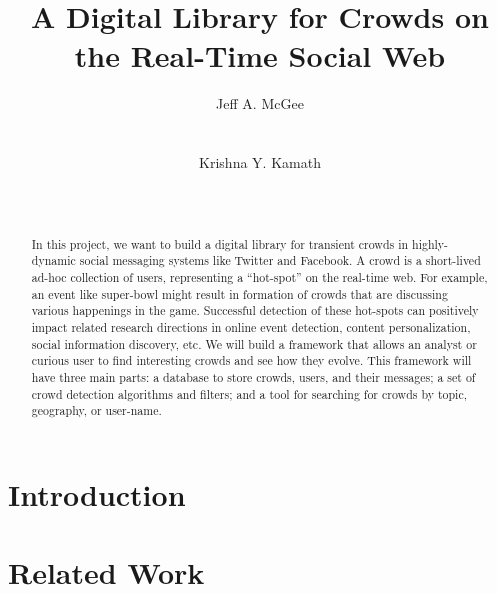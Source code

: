 \documentclass{sig-alternate}
\begin{document}
\title{A Digital Library for Crowds on the Real-Time Social Web}

\author{
\alignauthor Jeff A. McGee\\
       \\
       \\
\alignauthor Krishna Y. Kamath\\
      \\
       \\
}

\maketitle

\begin{abstract}
In this project, we want to build a digital library for transient crowds in highly-dynamic social messaging systems like Twitter and Facebook. A crowd is a short-lived ad-hoc collection of users, representing a ``hot-spot'' on the real-time web.  For example, an event like super-bowl might result in formation of crowds that are discussing various happenings in the game. Successful detection of these hot-spots can positively impact related research directions in online event detection, content personalization, social information discovery, etc. We will build a framework that allows an analyst or curious user to find interesting crowds and see how they evolve.  This framework will have three main parts: a database to store crowds, users, and their messages; a set of crowd detection algorithms and filters; and a tool for searching for crowds by topic, geography, or user-name.
\end{abstract}

\section{Introduction}

\section{Related Work}
\label{sec:reclated_work}
\end{document}
